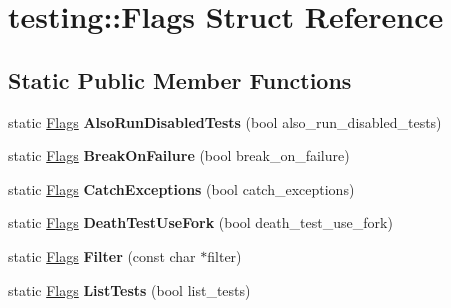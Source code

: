 \hypertarget{structtesting_1_1_flags}{}\section{testing\+:\+:Flags Struct Reference}
\label{structtesting_1_1_flags}
\subsection*{Static Public Member Functions}
\begin{DoxyCompactItemize}
\item 
\mbox{\label{structtesting_1_1_flags_a8bee2b5f94d8248b6791d6b005db146f}} 
static \mbox{\hyperlink{structtesting_1_1_flags}{Flags}} {\bfseries Also\+Run\+Disabled\+Tests} (bool also\+\_\+run\+\_\+disabled\+\_\+tests)
\item 
\mbox{\label{structtesting_1_1_flags_a62660e44922321f7640bc951a04c2296}} 
static \mbox{\hyperlink{structtesting_1_1_flags}{Flags}} {\bfseries Break\+On\+Failure} (bool break\+\_\+on\+\_\+failure)
\item 
\mbox{\label{structtesting_1_1_flags_a2c7d89f62f4328ae0ced66154ef96b44}} 
static \mbox{\hyperlink{structtesting_1_1_flags}{Flags}} {\bfseries Catch\+Exceptions} (bool catch\+\_\+exceptions)
\item 
\mbox{\label{structtesting_1_1_flags_a4468e5625833043596c44be174349d8c}} 
static \mbox{\hyperlink{structtesting_1_1_flags}{Flags}} {\bfseries Death\+Test\+Use\+Fork} (bool death\+\_\+test\+\_\+use\+\_\+fork)
\item 
\mbox{\label{structtesting_1_1_flags_afc7350b7c1ac4c0e0efe2d9a94729eb7}} 
static \mbox{\hyperlink{structtesting_1_1_flags}{Flags}} {\bfseries Filter} (const char $\ast$filter)
\item 
\mbox{\label{structtesting_1_1_flags_a825a5d763a31fe6c28f543990bd336df}} 
static \mbox{\hyperlink{structtesting_1_1_flags}{Flags}} {\bfseries List\+Tests} (bool list\+\_\+tests)
\item 
\mbox{\label{structtesting_1_1_flags_a507916734a6d7ff2dd02891d7849f2d3}} 

\end{DoxyCompactItemize}
